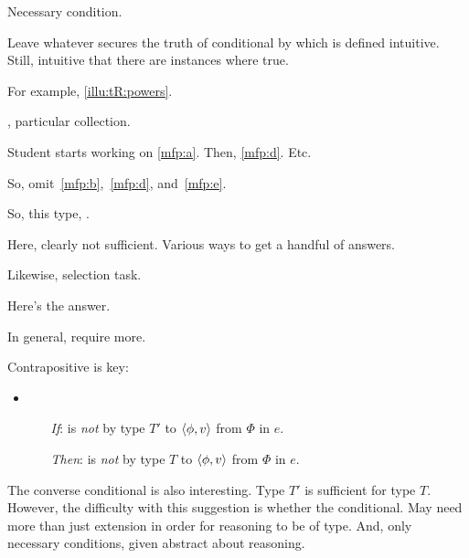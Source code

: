 \begin{note}
  Necessary condition.

  Leave whatever secures the truth of conditional by which \rotoc{} is defined intuitive.
  Still, intuitive that there are instances where true.

  For example, \autoref{illu:tR:powers}.

  \tocN{}, particular collection.

  Student starts working on \ref{mfp:a}.
  Then, \ref{mfp:d}.
  Etc.

  So, omit~\ref{mfp:b},~\ref{mfp:d}, and~\ref{mfp:e}.

  So, this type, \rotoc{}.

  Here, clearly not sufficient.
  Various ways to get a handful of answers.


  Likewise, selection task.

  Here's the answer.

  In general, require more.
\end{note}

\begin{note}
  Contrapositive is key:

  \begin{itemize}
  \item
    \begin{itemize}
    \item[\emph{If}:]
      \vAgent{} is \emph{not} \ptCV{} by type \(T'\) to \(\langle \phi, v \rangle\) from \(\Phi\) in \(e\).
    \item[\emph{Then}:]
      \vAgent{} is \emph{not} \tCV{} by type \(T\) to \(\langle \phi, v \rangle\) from \(\Phi\) in \(e\).
    \end{itemize}
  \end{itemize}
\end{note}

\begin{note}
  The converse conditional is also interesting.
  Type \(T'\) is sufficient for type \(T\).
  However, the difficulty with this suggestion is whether the conditional.
  May need more than just extension in order for reasoning to be of type.
  And, only necessary conditions, given abstract about reasoning.
\end{note}

\subsection{}
\label{cha:typical:sec:tR:tRDef}

